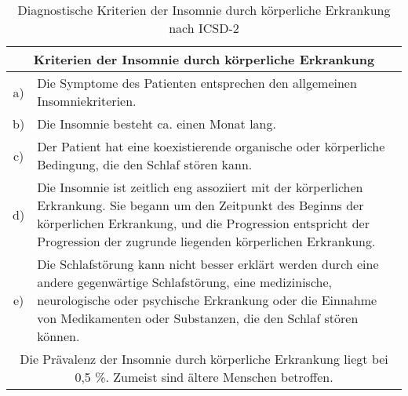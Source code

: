 \begin{table}[H] 
\centering
\begin{tabularx}{\textwidth}{cX}
\toprule
\multicolumn{2}{c}{\textbf{Kriterien der Insomnie durch körperliche Erkrankung}}\\
\midrule 
a) & Die Symptome des Patienten entsprechen den allgemeinen Insomniekriterien.\\
b) & Die Insomnie besteht ca. einen Monat lang.\\
c) & Der Patient hat eine koexistierende organische oder körperliche Bedingung, die den Schlaf stören kann.\\
d) & Die Insomnie ist zeitlich eng assoziiert mit der körperlichen Erkrankung. Sie begann um den Zeitpunkt des Beginns der körperlichen Erkrankung, und die Progression entspricht der Progression der zugrunde liegenden körperlichen Erkrankung.\\
e) & Die Schlafstörung kann nicht besser erklärt werden durch eine andere gegenwärtige Schlafstörung, eine medizinische, neurologische oder psychische Erkrankung oder die Einnahme von Medikamenten oder Substanzen, die den Schlaf stören können.\\
\midrule
\multicolumn{2}{p{0.97\textwidth}}{Die Prävalenz der Insomnie durch körperliche Erkrankung liegt bei 0,5 \%. Zumeist sind ältere Menschen betroffen.}\\
\bottomrule
\end{tabularx}
\caption[Kriterien der Insomnie durch körperliche Erkrankung]{Diagnostische Kriterien der Insomnie durch körperliche Erkrankung nach \acs{ICSD-2} \parencite{mayer_s3-leitlinie_2009, happe_schlafmedizin_2009}}
\label{tab:korperliche_insomnie}
\end{table}



\newpage


